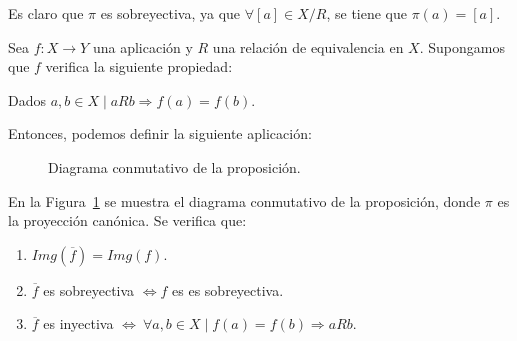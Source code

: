 Es claro que $\pi$ es sobreyectiva, ya que $\forall [a] \in X/R$, se tiene que $\pi(a) = [a]$.

\begin{prop}
    Sea $f:X \rightarrow Y$ una aplicación y $R$ una relación de equivalencia en $X$. Supongamos que $f$ verifica la siguiente propiedad:
    \begin{center}
        Dados $a,b \in X \mid aRb \Rightarrow f(a) = f(b)$.
    \end{center}
    
    Entonces, podemos definir la siguiente aplicación:

    \begin{figure}[h]
        \centering
        \caption{Diagrama conmutativo de la proposición.}
        \label{fig:DiagramaConmutativo}
    \end{figure}
    
    En la Figura~\ref{fig:DiagramaConmutativo} se muestra el diagrama conmutativo de la proposición, donde $\pi$ es la proyección canónica.
    Se verifica que:
    \begin{enumerate}
        \item $Img\left(\overline{f}\right) = Img(f)$.
        \item $\overline{f}$ es sobreyectiva $\Longleftrightarrow f$ es es sobreyectiva.
        \item $\overline{f}$ es inyectiva $\Longleftrightarrow~\forall a,b \in X \mid f(a) = f(b) \Rightarrow aRb$.
    \end{enumerate}
\end{prop}
